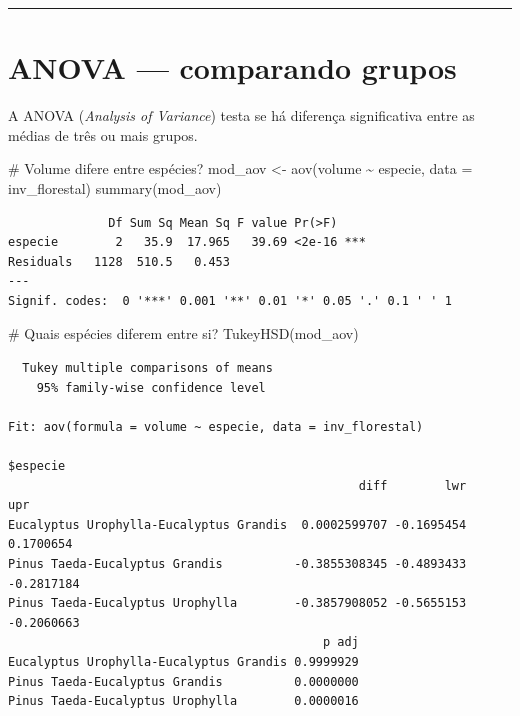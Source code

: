 \documentclass[
  letterpaper,
]{scrbook}
\newenvironment{Shaded}{\begin{snugshade}}{\end{snugshade}}
\newcommand{\AttributeTok}[1]{\textcolor[rgb]{0.40,0.45,0.13}{#1}}
\newcommand{\CommentTok}[1]{\textcolor[rgb]{0.37,0.37,0.37}{#1}}
\newcommand{\FunctionTok}[1]{\textcolor[rgb]{0.28,0.35,0.67}{#1}}
\newcommand{\NormalTok}[1]{\textcolor[rgb]{0.00,0.23,0.31}{#1}}
\newcommand{\OtherTok}[1]{\textcolor[rgb]{0.00,0.23,0.31}{#1}}
\newcommand{\SpecialCharTok}[1]{\textcolor[rgb]{0.37,0.37,0.37}{#1}}
\begin{document}
\begin{center}\rule{0.5\linewidth}{0.5pt}\end{center}

\section{ANOVA --- comparando grupos}\label{anova-comparando-grupos}

A ANOVA (\emph{Analysis of Variance}) testa se há diferença
significativa entre as médias de três ou mais grupos.

\begin{Shaded}
\begin{Highlighting}[]
\CommentTok{\# Volume difere entre espécies?}
\NormalTok{mod\_aov }\OtherTok{\textless{}{-}} \FunctionTok{aov}\NormalTok{(volume }\SpecialCharTok{\textasciitilde{}}\NormalTok{ especie, }\AttributeTok{data =}\NormalTok{ inv\_florestal)}
\FunctionTok{summary}\NormalTok{(mod\_aov)}
\end{Highlighting}
\end{Shaded}

\begin{verbatim}
              Df Sum Sq Mean Sq F value Pr(>F)    
especie        2   35.9  17.965   39.69 <2e-16 ***
Residuals   1128  510.5   0.453                   
---
Signif. codes:  0 '***' 0.001 '**' 0.01 '*' 0.05 '.' 0.1 ' ' 1
\end{verbatim}

\begin{Shaded}
\begin{Highlighting}[]
\CommentTok{\# Quais espécies diferem entre si?}
\FunctionTok{TukeyHSD}\NormalTok{(mod\_aov)}
\end{Highlighting}
\end{Shaded}

\begin{verbatim}
  Tukey multiple comparisons of means
    95% family-wise confidence level

Fit: aov(formula = volume ~ especie, data = inv_florestal)

$especie
                                                 diff        lwr        upr
Eucalyptus Urophylla-Eucalyptus Grandis  0.0002599707 -0.1695454  0.1700654
Pinus Taeda-Eucalyptus Grandis          -0.3855308345 -0.4893433 -0.2817184
Pinus Taeda-Eucalyptus Urophylla        -0.3857908052 -0.5655153 -0.2060663
                                            p adj
Eucalyptus Urophylla-Eucalyptus Grandis 0.9999929
Pinus Taeda-Eucalyptus Grandis          0.0000000
Pinus Taeda-Eucalyptus Urophylla        0.0000016
\end{verbatim}
\end{document}
